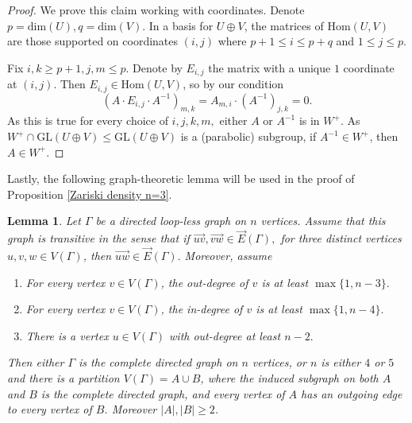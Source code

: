 \documentclass[letterpaper]{amsart}
\newtheorem{lemma}[theorem]{Lemma}
\begin{document}
\begin{proof}
We prove this claim working with coordinates. Denote $p = \mathrm{dim}(U), q = \mathrm{dim}(V)$. In a basis for $U \oplus V$, the matrices of $\mathrm{Hom}(U, V)$ are those supported on coordinates $(i, j)$ where $p + 1 \leq i \leq p + q$ and $1 \leq j \leq p$.

Fix $i, k \geq p + 1, j, m \leq p.$ Denote by $E_{i, j}$ the matrix with a unique $1$ coordinate at $(i, j)$. Then $E_{i, j} \in \mathrm{Hom}(U, V)$, so by our condition $$(A \cdot E_{i,j} \cdot A^{-1})_{m, k} = A_{m, i} \cdot (A^{-1})_{j, k} = 0.$$
As this is true for every choice of $i, j, k, m,$ either $A$ or $A^{-1}$ is in $W^+$. As $W^+ \cap \mathrm{GL}(U \oplus V) \leq \mathrm{GL}(U \oplus V)$ is a (parabolic) subgroup, if $A^{-1} \in W^+$, then $A \in W^+$.
\end{proof}
Lastly, the following graph-theoretic lemma will be used in the proof of Proposition \ref{Zariski density n=3}.
\begin{lemma}
\label{Graph Theoretic Lemma}
Let $\Gamma$ be a directed loop-less graph on $n$ vertices. Assume that this graph is transitive in the sense that if $\vec{uv}, \vec{vw} \in \vec{E}(\Gamma),$ for three distinct vertices $u,v,w \in V(\Gamma)$, then $\vec{uw} \in \vec{E}(\Gamma).$ Moreover, assume
\begin{enumerate}
    \item For every vertex $v \in V(\Gamma)$, the out-degree of $v$ is at least $\max\{1, n - 3\}.$
    \item For every vertex $v \in V(\Gamma)$, the in-degree of $v$ is at least $\max\{1, n - 4\}.$
    \item There is a vertex $u \in V(\Gamma)$ with out-degree at least $n - 2.$
\end{enumerate}
Then either $\Gamma$ is the complete directed graph on $n$ vertices, or $n$ is either $4$ or $5$ and there is a partition $V(\Gamma) = A \cup B$, where the induced subgraph on both $A$ and $B$ is the complete directed graph, and every vertex of $A$ has an outgoing edge to every vertex of $B$. Moreover $|A|, |B| \geq 2$.
\end{lemma}
\end{document}
